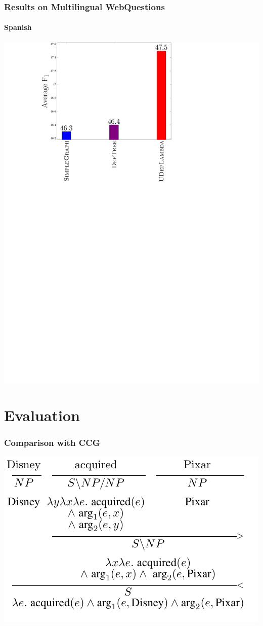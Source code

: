 \documentclass[mathserif,12pt]{beamer}
\begin{document}
\begin{frame}
\frametitle{Results on Multilingual WebQuestions}
\framesubtitle{Spanish}
\centering
\large
\vspace{0.4em}
\includegraphics[trim=9.5em 0em 23em 0.5em,clip=true,scale=0.5]{figures/deplambda_results_plot_ud-es}
\end{frame}


\section{Evaluation} 

\begin{frame}  
\frametitle{Comparison with CCG}
\centering
\includegraphics[trim=0em 1em 1em 0em,clip=true,scale=1.2]{figures/ccg-transitive}
\end{frame}
\end{document}
